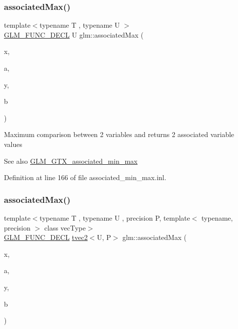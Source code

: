 \subsubsection{\texorpdfstring{associatedMax()}{associatedMax()}\hspace{0.1cm}{\footnotesize\ttfamily [1/12]}}
{\footnotesize\ttfamily template$<$typename T , typename U $>$ \\
\mbox{\hyperlink{setup_8hpp_ab2d052de21a70539923e9bcbf6e83a51}{G\+L\+M\+\_\+\+F\+U\+N\+C\+\_\+\+D\+E\+CL}} U glm\+::associated\+Max (\begin{DoxyParamCaption}\item[{T}]{x,  }\item[{U}]{a,  }\item[{T}]{y,  }\item[{U}]{b }\end{DoxyParamCaption})}

Maximum comparison between 2 variables and returns 2 associated variable values \begin{DoxySeeAlso}{See also}
\mbox{\hyperlink{group__gtx__associated__min__max}{G\+L\+M\+\_\+\+G\+T\+X\+\_\+associated\+\_\+min\+\_\+max}} 
\end{DoxySeeAlso}


Definition at line 166 of file associated\+\_\+min\+\_\+max.\+inl.

\mbox{\label{group__gtx__associated__min__max_ga10ba6001798f42a0f941f19ff30e066a}} 
\subsubsection{\texorpdfstring{associatedMax()}{associatedMax()}\hspace{0.1cm}{\footnotesize\ttfamily [2/12]}}
{\footnotesize\ttfamily template$<$typename T , typename U , precision P, template$<$ typename, precision $>$ class vec\+Type$>$ \\
\mbox{\hyperlink{setup_8hpp_ab2d052de21a70539923e9bcbf6e83a51}{G\+L\+M\+\_\+\+F\+U\+N\+C\+\_\+\+D\+E\+CL}} \mbox{\hyperlink{structglm_1_1tvec2}{tvec2}}$<$U, P$>$ glm\+::associated\+Max (\begin{DoxyParamCaption}\item[{vec\+Type$<$ T, P $>$ const \&}]{x,  }\item[{vec\+Type$<$ U, P $>$ const \&}]{a,  }\item[{vec\+Type$<$ T, P $>$ const \&}]{y,  }\item[{vec\+Type$<$ U, P $>$ const \&}]{b }\end{DoxyParamCaption})}

